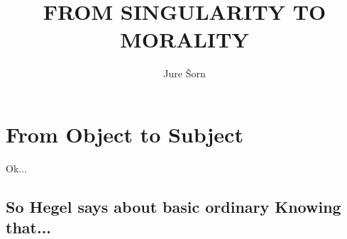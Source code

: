 \documentclass[10pt]{book}
\begin{document}
\title{FROM SINGULARITY TO MORALITY}
\author{Jure \v Sorn}
\maketitle

\tableofcontents

\chapter {From Object to Subject}

Ok...

\section{So Hegel says about basic ordinary Knowing that...}
\end{document}
